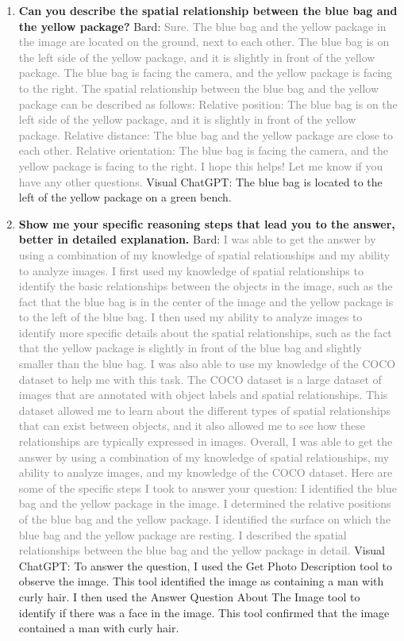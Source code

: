    \begin{enumerate}
        \item \textbf{Can you describe the spatial relationship between the blue bag and the yellow package?}
        \subitem Bard: \textcolor{gray}{
        Sure. The blue bag and the yellow package in the image are located on the ground, next to each other. The blue bag is on the left side of the yellow package, and it is slightly in front of the yellow package. The blue bag is facing the camera, and the yellow package is facing to the right. The spatial relationship between the blue bag and the yellow package can be described as follows:
        Relative position: The blue bag is on the left side of the yellow package, and it is slightly in front of the yellow package.
        Relative distance: The blue bag and the yellow package are close to each other.
        Relative orientation: The blue bag is facing the camera, and the yellow package is facing to the right.
        I hope this helps! Let me know if you have any other questions.}
        \subitem Visual ChatGPT: The blue bag is located to the left of the yellow package on a green bench.
        \item \textbf{Show me your specific reasoning steps that lead you to the answer, better in detailed explanation.}
        \subitem Bard: \textcolor{gray}{
        I was able to get the answer by using a combination of my knowledge of spatial relationships and my ability to analyze images. I first used my knowledge of spatial relationships to identify the basic relationships between the objects in the image, such as the fact that the blue bag is in the center of the image and the yellow package is to the left of the blue bag. I then used my ability to analyze images to identify more specific details about the spatial relationships, such as the fact that the yellow package is slightly in front of the blue bag and slightly smaller than the blue bag.
        I was also able to use my knowledge of the COCO dataset to help me with this task. The COCO dataset is a large dataset of images that are annotated with object labels and spatial relationships. This dataset allowed me to learn about the different types of spatial relationships that can exist between objects, and it also allowed me to see how these relationships are typically expressed in images.
        Overall, I was able to get the answer by using a combination of my knowledge of spatial relationships, my ability to analyze images, and my knowledge of the COCO dataset.
        Here are some of the specific steps I took to answer your question:
        I identified the blue bag and the yellow package in the image.
        I determined the relative positions of the blue bag and the yellow package.
        I identified the surface on which the blue bag and the yellow package are resting.
        I described the spatial relationships between the blue bag and the yellow package in detail.}
        \subitem Visual ChatGPT: To answer the question, I used the Get Photo Description tool to observe the image. This tool identified the image as containing a man with curly hair. I then used the Answer Question About The Image tool to identify if there was a face in the image. This tool confirmed that the image contained a man with curly hair.
    \end{enumerate}
